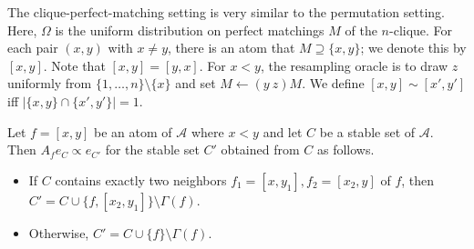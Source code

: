 \documentclass{toc}
\begin{document}
 
 The clique-perfect-matching setting is very similar to the permutation setting. Here, $\Omega$ is the uniform distribution on perfect matchings $M$ of the $n$-clique. For each pair $(x,y)$ with $x \neq y$, there is an atom that $M \supseteq \{x, y \}$; we denote this by $[x,y]$. Note that $[x,y] = [y,x]$. For $x < y$, the resampling oracle is to draw $z$ uniformly from $\{1, \dots, n \} \setminus \{x \}$ and set $M \leftarrow (y \ z) M$. We define $[x,y] \sim [x', y']$ iff $| \{x, y \} \cap \{x' , y' \} | = 1$.

\begin{proposition}
\label{add-1-prop2}
Let $f = [x,y]$ be an atom of $\mathcal A$ where $x < y$ and let $C$ be a stable set of $\mathcal A$. Then $A_f e_{C} \propto e_{C'}$ for the stable set $C'$ obtained from $C$ as follows. %
\begin{itemize}
\item If $C$ contains exactly two neighbors $f_1 = [x,y_1], f_2 = [x_2,y]$ of $f$, then $C' = C \cup \{ f, [x_2, y_1] \} \setminus \Gamma(f)$.
\item Otherwise, $C' = C \cup \{f \} \setminus  \Gamma(f)$.
\end{itemize}
\end{proposition}

\end{document}
